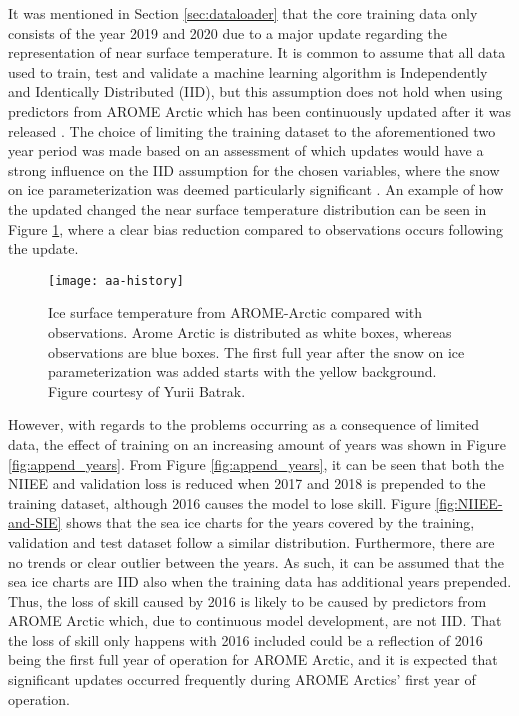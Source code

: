 \documentclass[../main/thesis]{subfiles}
\begin{document}
It was mentioned in Section \ref{sec:dataloader} that the core training data only consists of the year 2019 and 2020 due to a major update regarding the representation of near surface temperature. It is common to assume that all data used to train, test and validate a machine learning algorithm is Independently and Identically Distributed (IID), but this assumption does not hold when using predictors from AROME Arctic which has been continuously updated after it was released \citep{Mueller2017}. The choice of limiting the training dataset to the aforementioned two year period was made based on an assessment of which updates would have a strong influence on the IID assumption for the chosen variables, where the snow on ice parameterization was deemed particularly significant \citep{Batrak2019}. An example of how the updated changed the near surface temperature distribution can be seen in Figure \ref{fig:aa-history}, where a clear bias reduction compared to observations occurs following the update.

\begin{figure}
    \centering
    \texttt{[image: aa-history]}
    \caption{\label{fig:aa-history}Ice surface temperature from AROME-Arctic compared with observations. Arome Arctic is distributed as white boxes, whereas observations are blue boxes. The first full year after the snow on ice parameterization was added starts with the yellow background. Figure courtesy of Yurii Batrak.}
\end{figure}

However, with regards to the problems occurring as a consequence of limited data, the effect of training on an increasing amount of years was shown in Figure \ref{fig:append_years}. From Figure \ref{fig:append_years}, it can be seen that both the NIIEE and validation loss is reduced when 2017 and 2018 is prepended to the training dataset, although 2016 causes the model to lose skill. Figure \ref{fig:NIIEE-and-SIE} shows that the sea ice charts for the years covered by the training, validation and test dataset follow a similar distribution. Furthermore, there are no trends or clear outlier between the years. As such, it can be assumed that the sea ice charts are IID also when the training data has additional years prepended. Thus, the loss of skill caused by 2016 is likely to be caused by predictors from AROME Arctic which, due to continuous model development, are not IID. That the loss of skill only happens with 2016 included could be a reflection of 2016 being the first full year of operation for AROME Arctic, and it is expected that significant updates occurred frequently during AROME Arctics' first year of operation.
\end{document}
